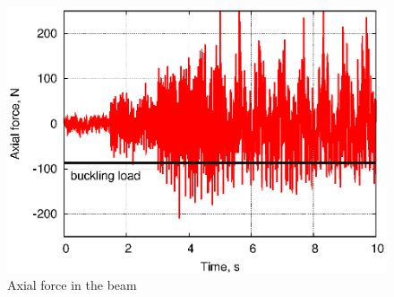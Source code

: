 \documentclass[11pt, a4paper, subeqn]{article}
\begin{document}
\begin{figure}
\centering
\includegraphics[width=.8\textwidth]{axial.eps}
\caption{Axial force in the beam}
\label{fig:axial}
\end{figure}




\end{document}
